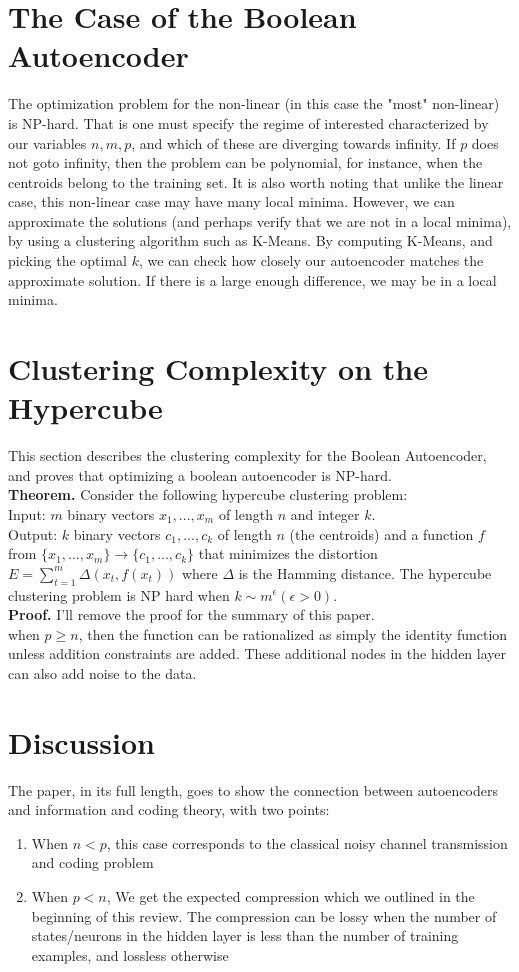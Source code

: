 \documentclass[20pt]{article} %
\begin{document}
\section{The Case of the Boolean Autoencoder}
The optimization problem for the non-linear (in this case the "most" non-linear) is NP-hard.  That is one must specify the regime of interested characterized by our variables $n,m,p$, and which of these are diverging towards infinity.  If $p$ does not goto infinity, then the problem can be polynomial, for instance, when the centroids belong to the training set.  It is also worth noting that unlike the linear case, this non-linear case may have many local minima.  However, we can approximate the solutions (and perhaps verify that we are not in a local minima), by using a clustering algorithm such as K-Means.  By computing K-Means, and picking the optimal $k$, we can check how closely our autoencoder matches the approximate solution.  If there is a large enough difference, we may be in a local minima.

\section{Clustering Complexity on the Hypercube}
This section describes the clustering complexity for the Boolean Autoencoder, and proves that optimizing a boolean autoencoder is NP-hard. \\
\textbf{Theorem.} Consider the following hypercube clustering problem: \\
Input: $m$ binary vectors $x_1, ..., x_m$ of length $n$ and integer $k$. \\
Output: $k$ binary vectors $c_1, ..., c_k$ of length $n$ (the centroids) and a function $f$ from $\{x_1, ..., x_m\} \rightarrow \{c_1, ..., c_k\}$ that minimizes the distortion $E = \sum_{t=1}^{m} \Delta(x_t, f(x_t))$ where $\Delta$ is the Hamming distance. The hypercube clustering problem is NP hard when $k \sim m^{\epsilon} (\epsilon > 0)$. \\
\textbf{Proof.} I'll remove the proof for the summary of this paper. \\

when $p \geq n$, then the function can be rationalized as simply the identity function unless addition constraints are added.  These additional nodes in the hidden layer can also add noise to the data.

\section{Discussion}
The paper, in its full length, goes to show the connection between autoencoders and information and coding theory, with two points:
\begin{enumerate}
\item When $n < p$, this case corresponds to the classical noisy channel transmission and coding problem
\item When $p < n$, We get the expected compression which we outlined in the beginning of this review.  The compression can be lossy when the number of states/neurons in the hidden layer is less than the number of training examples, and lossless otherwise
\end{enumerate}
\end{document}
